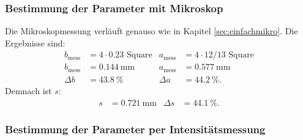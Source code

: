 \subsubsection{Bestimmung der Parameter mit Mikroskop}

Die Mikroskopmessung verläuft genauso wie in Kapitel \ref{sec:einfachmikro}.
Die Ergebnisse sind:
\begin{align*}
  b_\text{mess} &= 4 \cdot 0.23 \text{ Square} & a_\text{mess} &= 4\cdot 12/13 \text{ Square}\\
  b_\text{mess} &= \SI{0.144}{\milli\meter} & a_\text{mess} &= \SI{0.577}{\milli\meter}\\
  \Delta b &= \SI{43.8}{\percent} & \Delta a &= \SI{44.2}{\percent}.
\end{align*}
Demnach ist $s$:
\begin{align*}
  s &= \SI{0.721}{\milli\meter} & \Delta s &= \SI{44.1}{\percent}.
\end{align*}

\subsubsection{Bestimmung der Parameter per Intensitätsmessung}

